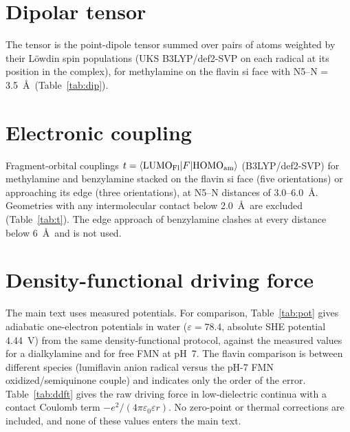 \documentclass[11pt]{article}
\begin{document}
\begin{table}[h]
\caption{Isotropic hyperfine couplings.}
\label{tab:hfc}
\centering

\end{table}

\begin{table}[h]
\caption{Spin-dipolar hyperfine tensors.}
\label{tab:tens}
\centering

\end{table}

\section{Dipolar tensor}
The tensor is the point-dipole tensor summed over pairs of atoms weighted by
their Löwdin spin populations (UKS B3LYP/def2-SVP on each radical at its position
in the complex), for methylamine on the flavin si face with N5--N = 3.5~\AA\
(Table~\ref{tab:dip}).

\begin{table}[h]
\caption{Dipolar coupling of the contact pair.}
\label{tab:dip}
\centering

\end{table}

\section{Electronic coupling}
Fragment-orbital couplings $t = \langle{\rm LUMO_{Fl}}|F|{\rm HOMO_{am}}\rangle$
(B3LYP/def2-SVP) for methylamine and benzylamine stacked on the flavin si face
(five orientations) or approaching its edge (three orientations), at N5--N
distances of 3.0--6.0~\AA. Geometries with any intermolecular contact below
2.0~\AA\ are excluded (Table~\ref{tab:t}). The edge approach of benzylamine
clashes at every distance below 6~\AA\ and is not used.

\begin{table}[h]
\caption{Coupling scan. ``valid'': non-clashing geometries of those computed.}
\label{tab:t}
\centering

\end{table}

\section{Density-functional driving force}
The main text uses measured potentials. For comparison, Table~\ref{tab:pot}
gives adiabatic one-electron potentials in water ($\varepsilon = 78.4$, absolute
SHE potential 4.44~V\cite{Jonsson1996}) from the same density-functional
protocol, against the measured values for a dialkylamine\cite{Jonsson1996} and
for free FMN at pH~7.\cite{Mayhew1999} The flavin comparison is between
different species (lumiflavin anion radical versus the pH-7 FMN
oxidized/semiquinone couple) and indicates only the order of the error.
Table~\ref{tab:ddft} gives the raw driving force in low-dielectric continua with
a contact Coulomb term $-e^2/(4\pi\varepsilon_0\varepsilon r)$. No zero-point or
thermal corrections are included, and none of these values enters the main
text.
\end{document}
